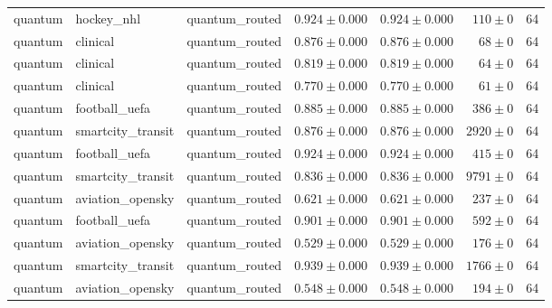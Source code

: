 \begin{table}[htbp]
\begin{tabular}{l l l r r r r}
quantum & hockey\_nhl & quantum\_routed & $0.924\pm0.000$ & $0.924\pm0.000$ & $110\pm0$ & 64 \\
quantum & clinical & quantum\_routed & $0.876\pm0.000$ & $0.876\pm0.000$ & $68\pm0$ & 64 \\
quantum & clinical & quantum\_routed & $0.819\pm0.000$ & $0.819\pm0.000$ & $64\pm0$ & 64 \\
quantum & clinical & quantum\_routed & $0.770\pm0.000$ & $0.770\pm0.000$ & $61\pm0$ & 64 \\
quantum & football\_uefa & quantum\_routed & $0.885\pm0.000$ & $0.885\pm0.000$ & $386\pm0$ & 64 \\
quantum & smartcity\_transit & quantum\_routed & $0.876\pm0.000$ & $0.876\pm0.000$ & $2920\pm0$ & 64 \\
quantum & football\_uefa & quantum\_routed & $0.924\pm0.000$ & $0.924\pm0.000$ & $415\pm0$ & 64 \\
quantum & smartcity\_transit & quantum\_routed & $0.836\pm0.000$ & $0.836\pm0.000$ & $9791\pm0$ & 64 \\
quantum & aviation\_opensky & quantum\_routed & $0.621\pm0.000$ & $0.621\pm0.000$ & $237\pm0$ & 64 \\
quantum & football\_uefa & quantum\_routed & $0.901\pm0.000$ & $0.901\pm0.000$ & $592\pm0$ & 64 \\
quantum & aviation\_opensky & quantum\_routed & $0.529\pm0.000$ & $0.529\pm0.000$ & $176\pm0$ & 64 \\
quantum & smartcity\_transit & quantum\_routed & $0.939\pm0.000$ & $0.939\pm0.000$ & $1766\pm0$ & 64 \\
quantum & aviation\_opensky & quantum\_routed & $0.548\pm0.000$ & $0.548\pm0.000$ & $194\pm0$ & 64 \\
\hline
\end{tabular}
\end{table}
